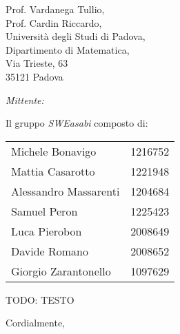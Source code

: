 \documentclass{article}
\begin{document}
\begin{center}
\begin{minipage}[t]{0.49\linewidth}
\begin{flushleft}
\begin{minipage}[t]{0.8\linewidth}
\begin{flushleft}
            Prof. Vardanega Tullio,\\
            Prof. Cardin Riccardo,\\
            Università degli Studi di Padova,\\
            Dipartimento di Matematica,\\
            Via Trieste, 63\\
            35121 Padova\\        
        \end{flushleft}
        \end{minipage}
        \end{flushleft}
    \end{minipage}
    \begin{minipage}[t]{0.49\linewidth}
        \begin{flushright}

        \begin{minipage}[t]{1\linewidth}
            
        \begin{flushright}
        \normalsize
        \textit{Mittente:}
        \vspace{0.5cm}

        Il gruppo \textit{SWEasabi} composto di:
            \begin{tabularx}{0.87\linewidth}{l | X}
                Michele Bonavigo & 1216752 \\
                Mattia Casarotto & 1221948 \\
                Alessandro Massarenti & 1204684 \\
                Samuel Peron & 1225423 \\
                Luca Pierobon & 2008649 \\
                Davide Romano & 2008652 \\
                Giorgio Zarantonello & 1097629 
            \end{tabularx}
        \end{flushright}
        \end{minipage}
        \end{flushright}
    \end{minipage}
    
    \normalsize
\end{center}

\vspace{1,5cm}

TODO: TESTO

Cordialmente,
\end{document}
